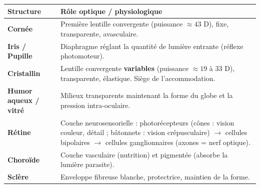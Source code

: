 \documentclass[11pt]{article}
\begin{document}
\begin{propriete}
\begin{center}
\begin{tabularx}{\linewidth}{|l|X|}\hline
\rowcolor{popblueL} \textbf{Structure} & \textbf{Rôle optique / physiologique} \\\hline
\textbf{Cornée} & Première lentille convergente (puissance $\approx 43$ D), fixe, transparente, avasculaire.\\\hline
\textbf{Iris / Pupille} & Diaphragme réglant la quantité de lumière entrante (réflexe photomoteur).\\\hline
\textbf{Cristallin} & Lentille convergente \textbf{variables} (puissance $\approx 19$ à $33$ D), transparente, élastique. Siège de l'accommodation.\\\hline
\textbf{Humor aqueux / vitré} & Milieux transparents maintenant la forme du globe et la pression intra-oculaire.\\\hline
\textbf{Rétine} & Couche neurosensorielle : photorécepteurs (cônes : vision couleur, détail ; bâtonnets : vision crépusculaire) $\rightarrow$ cellules bipolaires $\rightarrow$ cellules ganglionnaires (axones = nerf optique).\\\hline
\textbf{Choroïde} & Couche vasculaire (nutrition) et pigmentée (absorbe la lumière parasite).\\\hline
\textbf{Sclère} & Enveloppe fibreuse blanche, protectrice, maintien de la forme.\\\hline
\end{tabularx}
\end{center}
\end{propriete}
\end{document}
